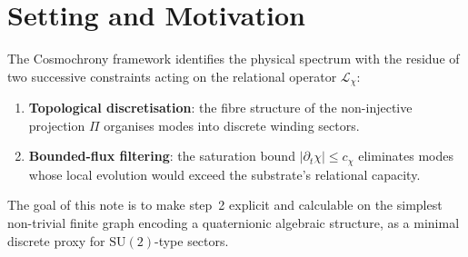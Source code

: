 \section{Setting and Motivation}

  The Cosmochrony framework identifies the physical spectrum with the residue of two
  successive constraints acting on the relational operator $\mathcal{L}_\chi$:
  \begin{enumerate}
    \item \textbf{Topological discretisation}: the fibre structure of the non-injective
    projection $\Pi$ organises modes into discrete winding sectors.
    \item \textbf{Bounded-flux filtering}: the saturation bound
    $|\partial_t \chi| \leq c_\chi$ eliminates modes whose local evolution would
    exceed the substrate's relational capacity.
  \end{enumerate}
  The goal of this note is to make step~2 explicit and calculable on the simplest
  non-trivial finite graph encoding a quaternionic algebraic structure,
  as a minimal discrete proxy for $\mathrm{SU}(2)$-type sectors.
